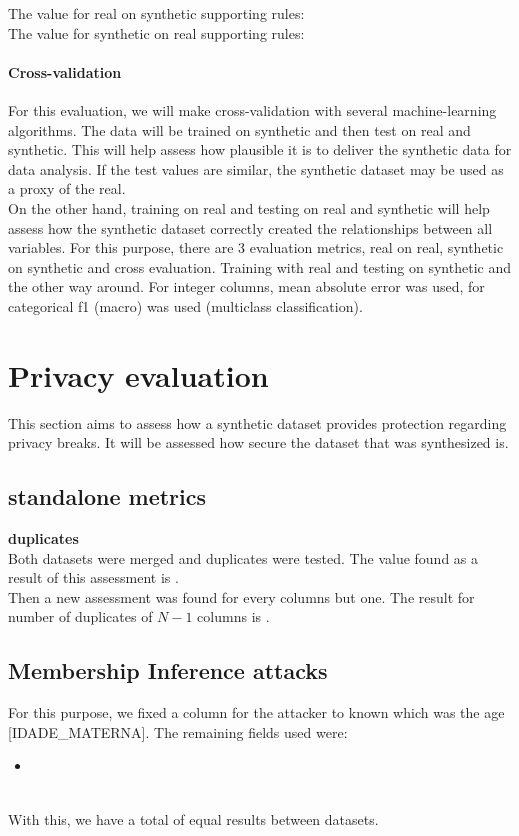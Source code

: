 \documentclass{article}
\begin{document}
The value for real on synthetic supporting rules:  \\

The value for synthetic on real supporting rules:  \\


\paragraph{Cross-validation}
For this evaluation, we will make cross-validation with several machine-learning algorithms.
The data will be trained on synthetic and then test on real and synthetic. This will help assess how plausible it is to deliver the synthetic data for data analysis. If the test values are similar, the synthetic dataset may be used as a proxy of the real.\\
On the other hand, training on real and testing on real and synthetic will help assess how the synthetic dataset correctly created the relationships between all variables.
For this purpose, there are 3 evaluation metrics, real on real, synthetic on synthetic and cross evaluation. Training with real and testing on synthetic and the other way around. For integer columns, mean absolute error was used, for categorical f1 (macro) was used (multiclass classification).\\





\section{Privacy evaluation}
This section aims to assess how a synthetic dataset provides protection regarding privacy breaks. It will be assessed how secure the dataset that was synthesized is.
\subsection{standalone metrics}
\textbf{duplicates}\\

Both datasets were merged and duplicates were tested. The value found as a result of this assessment is .\\
Then a new assessment was found for every columns but one. The result for number of duplicates of $N-1$ columns is . 

\subsection{Membership Inference attacks}
For this purpose, we fixed a column for the attacker to known which was the age [IDADE\_MATERNA].
The remaining fields used were:
\begin{itemize}
  \item {}
  \end{itemize}
\\
With this, we have a total of  equal results between datasets.
\end{document}
